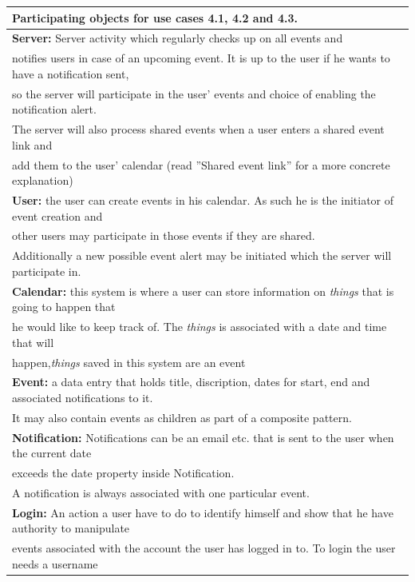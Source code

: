 \documentclass[a4paper]{article}
\begin{document}
\begin{tabular}{l}
	\textbf{Participating objects for use cases 4.1, 4.2 and 4.3.}\\
	\hline
	\textbf{Server:} 
    Server activity which regularly checks up on all events and \\
	notifies users in case of an upcoming event. It is up to the user if he wants to have a notification sent,\\ 
	so the server will participate in the user’ events and choice of enabling the notification alert.\\ The server will also process shared events when a user enters a shared event link and\\
    add them to the user' calendar (read ''Shared event link'' for a more concrete explanation)\\
	\hline
	\textbf{User:} 
    the user can create events in his calendar. As such he is the initiator of event creation and \\
	other users may participate in those events if they are shared. \\
	Additionally a new possible event alert may be initiated which the server will participate in.\\
	\hline
    \textbf{Calendar:} 
    this system is where a user can store information on \textit{things} that is going to happen that\\
    he would like to keep track of. The \textit{things} is associated with a date and time that will\\
    happen,\textit{things} saved in this system are an event \\
	\hline
    \textbf{Event:} 
    a data entry that holds title, discription, dates for start, end and associated notifications to it.\\ It may also contain events as children as part of a composite pattern. \\
	\hline
    \textbf{Notification:} 
    Notifications can be an email etc. that is sent to the user when the current date\\
    exceeds the date property inside Notification.\\
    A notification is always associated with one particular event.\\
	\hline
    \textbf{Login:} 
    An action a user have to do to identify himself and show that he have authority to manipulate\\
    events associated with the account the user has logged in to. To login the user needs a username\\

\end{tabular}
\end{document}
